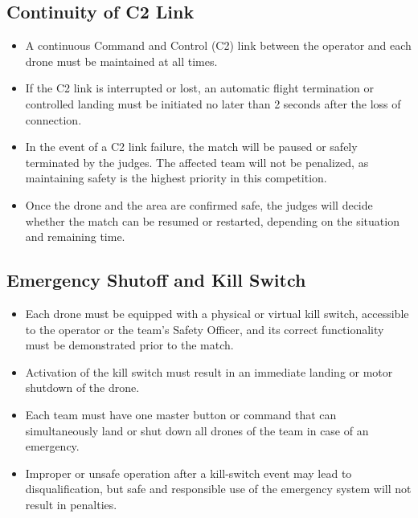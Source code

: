 \subsection{Continuity of C2 Link}
\begin{itemize}
	\item{A continuous Command and Control (C2) link between the operator and each drone must be maintained at all times.}
	\item{If the C2 link is interrupted or lost, an automatic flight termination or controlled landing must be initiated no later than 2 seconds after the loss of connection.}
	\item{In the event of a C2 link failure, the match will be paused or safely terminated by the judges. The affected team will not be penalized, as maintaining safety is the highest priority in this competition.}
	\item{Once the drone and the area are confirmed safe, the judges will decide whether the match can be resumed or restarted, depending on the situation and remaining time.}
\end{itemize}

\subsection{Emergency Shutoff and Kill Switch}
\begin{itemize}
	\item{Each drone must be equipped with a physical or virtual kill switch, accessible to the operator or the team's Safety Officer, and its correct functionality must be demonstrated prior to the match.}
	\item{Activation of the kill switch must result in an immediate landing or motor shutdown of the drone.}
	\item{Each team must have one master button or command that can simultaneously land or shut down all drones of the team in case of an emergency.}
	\item{Improper or unsafe operation after a kill-switch event may lead to disqualification, but safe and responsible use of the emergency system will not result in penalties.}
\end{itemize}
